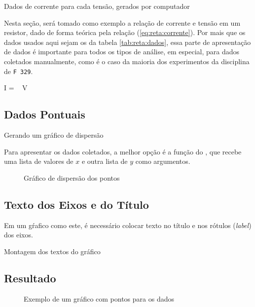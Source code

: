 \begin{table}[H]
    \centering
    
    \caption{Dados de corrente para cada tensão, gerados por computador}
    \label{tab:reta:dados}
\end{table}

Nesta seção, será tomado como exemplo a relação de corrente e tensão em um resistor, dado de forma teórica pela relação (\ref{eq:reta:corrente}). Por mais que os dados usados aqui sejam os da tabela \ref{tab:reta:dados}, essa parte de apresentação de dados é importante para todos os tipos de análise, em especial, para dados coletados manualmente, como é o caso da maioria dos experimentos da disciplina de \texttt{F 329}.

\begin{equacao} \label{eq:reta:corrente}
    I =  ~ V
\end{equacao}


\subsection{Dados Pontuais}

    \begin{listing}[H]
        \caption{Gerando um gráfico de dispersão}
        \label{code:reta:scatter}

    \end{listing}

    Para apresentar os dados coletados, a melhor opção é a função  do \pyplot, que recebe uma lista de valores de $x$ e outra lista de $y$ como argumentos.

    \begin{figure}[htbp]
        \centering
        

        \caption{Gráfico de dispersão dos pontos}
        \label{fig:reta:dados}
    \end{figure}


\subsection{Texto dos Eixos e do Título}

    Em um gŕafico como este, é necessário colocar texto no título e nos rótulos (\textit{label}) dos eixos.

    \begin{listing}[H]
        \caption{Montagem dos textos do gráfico}
        \label{code:reta:textos}

    \end{listing}


\subsection{Resultado}

    \begin{figure}[htbp]
        \centering
        

        \caption{Exemplo de um gráfico com pontos para os dados}
        \label{fig:reta:resultado}
    \end{figure}

